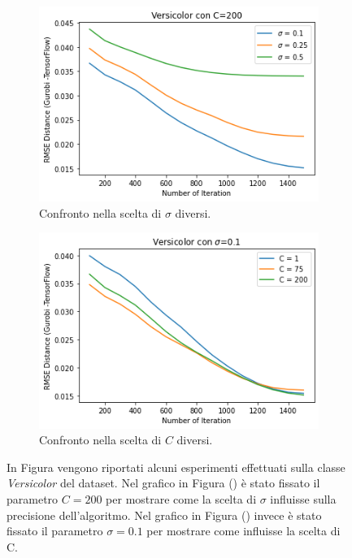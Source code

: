 \documentclass[a4paper,12pt]{report}
\begin{document}
\begin{figure}[H]
    \begin{subfigure}{0.47\textwidth}
        \centering
        \includegraphics[scale=0.5]{images/Grafici/Versicolor_C200_sigmaDiversi.png}
        \caption{Confronto nella scelta di $\sigma$ diversi.}
        \label{subfig:Versicolor_C200_sigmaDiversi}
    \end{subfigure}
    \begin{subfigure}{0.47\textwidth}
        \centering
        \includegraphics[scale=0.5]{images/Grafici/Versicolor_Cdiversi_sigma01.png}
        \caption{Confronto nella scelta di $C$ diversi.}
        \label{subfig:Versicolor_Cdiversi_sigma01}
    \end{subfigure}
    \caption{In Figura vengono riportati alcuni esperimenti effettuati sulla classe \textit{Versicolor} del dataset. Nel grafico in Figura () è stato fissato il parametro $C=200$ per mostrare come la scelta di $\sigma$ influisse sulla precisione dell'algoritmo. Nel grafico in Figura () invece è stato fissato il parametro $\sigma = 0.1$ per mostrare come influisse la scelta di C.}
    \label{fig:Versicolor_Preliminari}
\end{figure}
\end{document}
